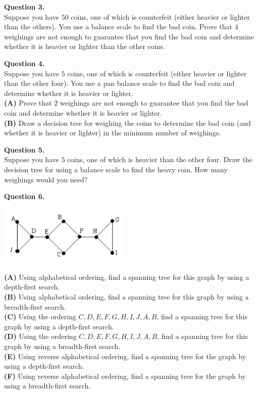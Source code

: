\documentclass[jou]{apa6}
\begin{document}
\vspace{10pt}
{\bf Question 3.}\\
Suppose you have $50$ coins, one of which is counterfeit 
(either heavier or lighter than the others). You use a
balance scale to find the bad coin. Prove that $4$ weighings 
are not enough to guarantee that you find the
bad coin and determine whether 
it is heavier or lighter than the other coins.


\vspace{10pt}
{\bf Question 4.}\\
Suppose you have $5$ coins, one of which is counterfeit 
(either heavier or lighter than the other four). You use
a pan balance scale to find the bad coin and determine 
whether it is heavier or lighter.\\
{\bf (A)} Prove that $2$ weighings are not enough to guarantee 
that you find the bad coin and determine whether it
is heavier or lighter.\\
{\bf (B)}  Draw a decision tree for weighing the coins to determine 
the bad coin (and whether it is heavier or lighter)
in the minimum number of weighings.


\vspace{10pt}
{\bf Question 5.}\\
Suppose you have $5$ coins, one of which is heavier than the other four. 
Draw the decision tree for using a
balance scale to find the heavy coin. How many weighings would you need?



\vspace{10pt}
{\bf Question 6.} 
\begin{center}
\includegraphics[width=2.5in]{quiz12-graph.png}
\end{center}
{\bf (A)} Using alphabetical ordering, find a spanning tree for this graph by using a depth-first search.\\
{\bf (B)} Using alphabetical ordering, find a spanning tree for this graph by using a breadth-first search.\\
{\bf (C)} Using the ordering $C, D, E, F, G, H, I, J, A, B$, find a spanning tree for this graph by using a depth-first search.\\
{\bf (D)} Using the ordering $C, D, E, F, G, H, I, J, A, B$, find a spanning tree for this graph by using a breadth-first search.\\
{\bf (E)} Using reverse alphabetical ordering, find a spanning tree for the graph by using a depth-first search.\\
{\bf (F)} Using reverse alphabetical ordering, find a spanning tree for the graph by using a breadth-first search.
\end{document}
